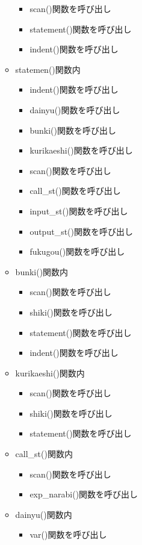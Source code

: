 \documentclass{jarticle}
\begin{document}
\begin{itemize}
\begin{itemize}
    \begin{itemize}
      \item scan()関数を呼び出し
      \item statement()関数を呼び出し
      \item indent()関数を呼び出し
    \end{itemize}
    \item statemen()関数内
    \begin{itemize}
      \item indent()関数を呼び出し
      \item dainyu()関数を呼び出し
      \item bunki()関数を呼び出し
      \item kurikaeshi()関数を呼び出し
      \item scan()関数を呼び出し
      \item call\_st()関数を呼び出し
      \item input\_st()関数を呼び出し
      \item output\_st()関数を呼び出し
      \item fukugou()関数を呼び出し
    \end{itemize}
    \item bunki()関数内
    \begin{itemize}
      \item scan()関数を呼び出し
      \item shiki()関数を呼び出し
      \item statement()関数を呼び出し
      \item indent()関数を呼び出し
    \end{itemize}
    \item kurikaeshi()関数内
    \begin{itemize}
      \item scan()関数を呼び出し
      \item shiki()関数を呼び出し
      \item statement()関数を呼び出し
    \end{itemize}
    \item call\_st()関数内
    \begin{itemize}
      \item scan()関数を呼び出し
      \item exp\_narabi()関数を呼び出し
    \end{itemize}
    \item dainyu()関数内
    \begin{itemize}
      \item var()関数を呼び出し

\end{itemize}
\end{itemize}
\end{itemize}
\end{document}
